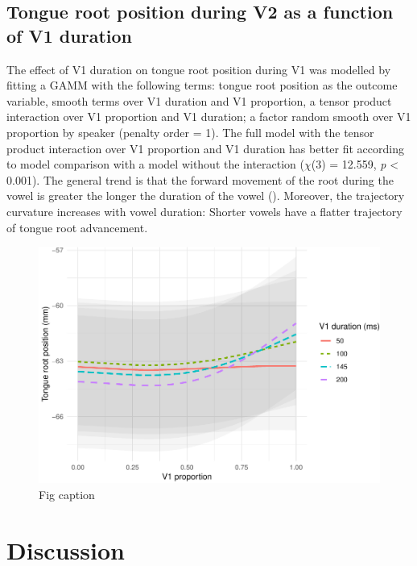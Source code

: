 \documentclass[12pt,]{article}
\begin{document}
\hypertarget{tongue-root-position-during-v2-as-a-function-of-v1-duration}{%
\subsection{Tongue root position during V2 as a function of V1
duration}\label{tongue-root-position-during-v2-as-a-function-of-v1-duration}}

The effect of V1 duration on tongue root position during V1 was modelled
by fitting a GAMM with the following terms: tongue root position as the
outcome variable, smooth terms over V1 duration and V1 proportion, a
tensor product interaction over V1 proportion and V1 duration; a factor
random smooth over V1 proportion by speaker (penalty order = 1). The
full model with the tensor product interaction over V1 proportion and V1
duration has better fit according to model comparison with a model
without the interaction (\(\chi\)(3) = 12.559, \emph{p} \textless{}
0.001). The general trend is that the forward movement of the root
during the vowel is greater the longer the duration of the vowel
(). Moreover, the trajectory curvature increases
with vowel duration: Shorter vowels have a flatter trajectory of tongue
root advancement.

\begin{figure}
\includegraphics[width=\linewidth]{2018-tra_files/figure-latex/tra-gam-2-plot-1} \caption{Fig caption}\label{f:tra-gam-2-plot}
\end{figure}

\hypertarget{discussion}{%
\section{Discussion}\label{discussion}}
\end{document}
